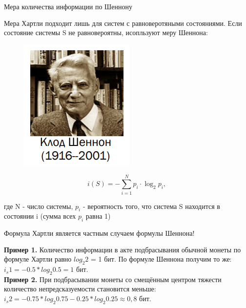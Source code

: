 \documentclass{beamer}
\begin{document}
\begin{frame}
    \begin{flushright}
        Мера количества информации по Шеннону
    \end{flushright}
    Мера Хартли подходит лишь для систем с равноверотяными состояниями. Если состояние системы S не равновероятны, исопльзуют меру Шеннона: \\
    
    \begin{figure}
        \centering
        \includegraphics{img1.png} 
    \end{figure}
    
    \[
    i(S) = -\sum_{i=1}^{N} p_i \cdot \log_2 p_i,
    \]
    
    где N - число системы, 
    $p_i$ - вероятность того, что система S находится в
    состоянии i (сумма всех $p_i$ равна 1)
    \begin{center}
        Формула Хартли является частным случаем формулы Шеннона!
    \end{center}
    \textbf{Пример 1.} Количество информации в акте подбрасывания обычной монеты по формуле Хартли равно $log_2 2$ = 1 бит.  По формуле Шеннона получим то же: $i_s1 = -0.5*log_2 0.5 = 1$ бит.\\
    \textbf{Пример 2.} При подбрасывании монеты со смещённым центром тяжести количество непредсказуемости становится меньше: $i_s2 = -0.75 * log_2 0.75 - 0.25 * log_2 0.25 \approx 0,8$ бит.
\end{frame}
\end{document}
